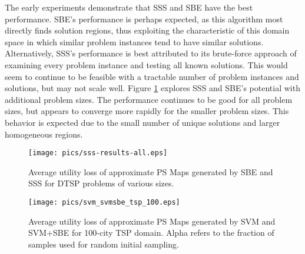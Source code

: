 The early experiments demonstrate that SSS and SBE have the best performance.  SBE's performance is perhaps expected, as this algorithm most directly finds solution regions, thus exploiting the characteristic of this domain space in which similar problem instances tend to have similar solutions.  Alternatively, SSS's performance is best attributed to its brute-force approach of examining every problem instance and testing all known solutions.  This would seem to continue to be feasible with a tractable number of problem instances and solutions, but may not scale well.  Figure \ref{fig:sss-results-all} explores SSS and SBE's potential with additional problem sizes.  The performance continues to be good for all problem sizes, but appears to converge more rapidly for the smaller problem sizes.  This behavior is expected due to the small number of unique solutions and larger homogeneous regions.








\begin{figure}
\begin{center}
\texttt{[image: pics/sss-results-all.eps]}
\caption{Average utility loss of approximate PS Maps generated by SBE and SSS for DTSP problems of various sizes.}
\label{fig:sss-results-all}
\end{center}
\end{figure}



\begin{figure}
\begin{center}
\texttt{[image: pics/svm\_svmsbe\_tsp\_100.eps]}
\caption{Average utility loss of approximate PS Maps generated by SVM and SVM+SBE for 100-city TSP domain. Alpha refers to the fraction of samples used for random initial sampling.}
\label{fig:svm_svmsbe_tsp_100}
\end{center}
\end{figure}



